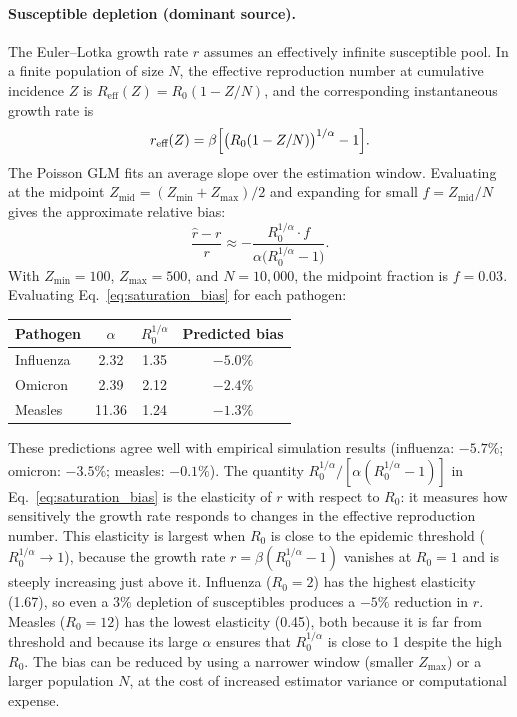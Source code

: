 \paragraph{Susceptible depletion (dominant source).} The Euler--Lotka growth rate $r$ assumes an effectively infinite susceptible pool. In a finite population of size $N$, the effective reproduction number at cumulative incidence $Z$ is $R_{\text{eff}}(Z) = R_0 (1 - Z/N)$, and the corresponding instantaneous growth rate is
%
\begin{equation}
	r_{\text{eff}}(Z) = \beta \Bigl[\bigl(R_0 (1 - Z/N)\bigr)^{1/\alpha} - 1\Bigr].
\end{equation}
%
The Poisson GLM fits an average slope over the estimation window. Evaluating at the midpoint $Z_{\text{mid}} = (Z_{\min} + Z_{\max})/2$ and expanding for small $f = Z_{\text{mid}} / N$ gives the approximate relative bias:
%
\begin{equation}
	\frac{\hat{r} - r}{r}
	\approx -\frac{R_0^{1/\alpha} \cdot f}{\alpha \bigl(R_0^{1/\alpha} - 1\bigr)}.
	\label{eq:saturation_bias}
\end{equation}
%
With $Z_{\min} = 100$, $Z_{\max} = 500$, and $N = 10{,}000$, the midpoint fraction is $f = 0.03$. Evaluating Eq.~\eqref{eq:saturation_bias} for each pathogen:

\begin{center}
\begin{tabular}{lccc}
	\hline\hline
	Pathogen & $\alpha$ & $R_0^{1/\alpha}$ & Predicted bias \\
	\hline
	Influenza & 2.32 & 1.35 & $-5.0\%$ \\
	Omicron   & 2.39 & 2.12 & $-2.4\%$ \\
	Measles   & 11.36 & 1.24 & $-1.3\%$ \\
	\hline\hline
\end{tabular}
\end{center}

\noindent These predictions agree well with empirical simulation results (influenza: $-5.7\%$; omicron: $-3.5\%$; measles: $-0.1\%$). The quantity $R_0^{1/\alpha}/[\alpha(R_0^{1/\alpha} - 1)]$ in Eq.~\eqref{eq:saturation_bias} is the elasticity of $r$ with respect to $R_0$: it measures how sensitively the growth rate responds to changes in the effective reproduction number. This elasticity is largest when $R_0$ is close to the epidemic threshold ($R_0^{1/\alpha} \to 1$), because the growth rate $r = \beta(R_0^{1/\alpha} - 1)$ vanishes at $R_0 = 1$ and is steeply increasing just above it. Influenza ($R_0 = 2$) has the highest elasticity (1.67), so even a 3\% depletion of susceptibles produces a $-5\%$ reduction in $r$. Measles ($R_0 = 12$) has the lowest elasticity (0.45), both because it is far from threshold and because its large $\alpha$ ensures that $R_0^{1/\alpha}$ is close to 1 despite the high $R_0$. The bias can be reduced by using a narrower window (smaller $Z_{\max}$) or a larger population $N$, at the cost of increased estimator variance or computational expense.


